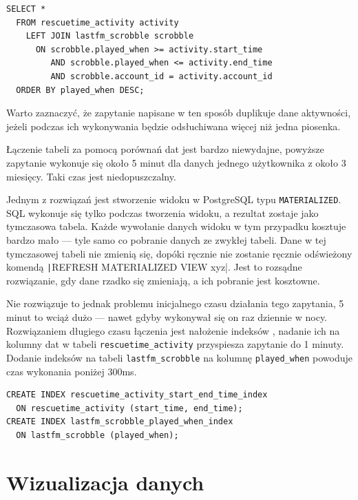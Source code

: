 \documentclass[openright]{xmgr}
\begin{document}
\begin{verbatim}
SELECT *
  FROM rescuetime_activity activity
    LEFT JOIN lastfm_scrobble scrobble
      ON scrobble.played_when >= activity.start_time
         AND scrobble.played_when <= activity.end_time
         AND scrobble.account_id = activity.account_id
  ORDER BY played_when DESC;
\end{verbatim}

        Warto zaznaczyć, że zapytanie napisane w ten sposób duplikuje dane aktywności,
        jeżeli podczas ich wykonywania będzie odsłuchiwana więcej niż jedna piosenka.

        Łączenie tabeli za pomocą porównań dat jest bardzo niewydajne,
        powyższe zapytanie wykonuje się około 5 minut dla danych jednego użytkownika z około 3 miesięcy.
        Taki czas jest niedopuszczalny.

        Jednym z rozwiązań jest stworzenie widoku w PostgreSQL typu \verb|MATERIALIZED|.
        SQL wykonuje się tylko podczas tworzenia widoku, a rezultat zostaje jako tymczasowa tabela.
        Każde wywołanie danych widoku w tym przypadku kosztuje bardzo mało --- tyle samo co pobranie danych ze zwykłej tabeli.
        Dane w tej tymczasowej tabeli nie zmienią się, dopóki ręcznie nie zostanie ręcznie odświeżony komendą
        \texttt|REFRESH MATERIALIZED VIEW xyz|. Jest to rozsądne rozwiązanie, gdy dane rzadko się zmieniają, a ich pobranie jest kosztowne.

        Nie rozwiązuje to jednak problemu inicjalnego czasu działania tego zapytania,
        5 minut to wciąż dużo --- nawet gdyby wykonywał się on raz dziennie w nocy.
        Rozwiązaniem długiego czasu łączenia jest nałożenie indeksów \cite{postgresql:efficient-indexes},
        nadanie ich na kolumny dat w tabeli \verb|rescuetime_activity| przyspiesza zapytanie do 1 minuty.
        Dodanie indeksów na tabeli \verb|lastfm_scrobble| na kolumnę \verb|played_when| powoduje czas wykonania poniżej 300ms.

\begin{verbatim}
CREATE INDEX rescuetime_activity_start_end_time_index
  ON rescuetime_activity (start_time, end_time);
CREATE INDEX lastfm_scrobble_played_when_index
  ON lastfm_scrobble (played_when);
\end{verbatim}

\chapter{Wizualizacja danych}
\end{document}
